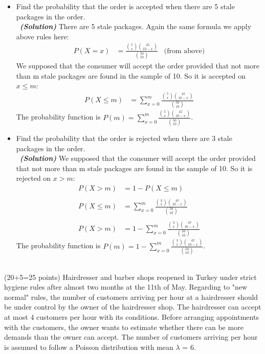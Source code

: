 \documentclass[a4 paper]{article}
\numberwithin{equation}{section}
\newcommand{\problem}[2]{~\\\fbox{\textbf{Problem #1}}\hfill (#2 points)\newline\newline}
\newcommand{\solution}{~\newline\textbf{\textit{(Solution)}} }
\newcommand{\0}{\mathbf{0}}
\begin{document}
\begin{itemize}
	\item Find the probability that the order is accepted when there are 5 stale packages in the order.\\
	\solution
	   There are 5 stale packages. Again the same formula we apply above rules here:
	   \begin{align*}
	       P(X=x) &= \frac{\binom{5}{x}\binom{45}{10-x}}{\binom{50}{10}}  \;\;\; \text{(from above)}
	   \end{align*}
	We supposed that the consumer will accept the order provided that not more than m stale packages are found in the sample of 10. So it is accepted on $x\leq m$:
	\begin{align*}
	    P(X\leq m) &= \sum_{x=0}^{m}\frac{\binom{5}{x}\binom{45}{10-x}}{\binom{50}{10}}
	\end{align*}
	The probability function is $P(m) = \sum_{x=0}^{m}\frac{\binom{5}{x}\binom{45}{10-x}}{\binom{50}{10}}$.
	\newline
	\item Find the probability that the order is rejected when there are 3 stale packages in the order.\\
	\solution
	We supposed that the consumer will accept the order provided that not more than m stale packages are found in the sample of 10. So it is rejected on $x > m$:
	    \begin{align*}
	    P(X>m) &=  1 - P(X \leq m) \\ \\
	    P(X\leq m) &= \sum_{x=0}^{m}\frac{\binom{3}{x}\binom{47}{10-x}}{\binom{50}{10}} \\ \\
	    P(X>m) &= 1 - \sum_{x=0}^{m}\frac{\binom{3}{x}\binom{47}{10-x}}{\binom{50}{10}}
	\end{align*}
	The probability function is $P(m) =  1 - \sum_{x=0}^{m}\frac{\binom{3}{x}\binom{47}{10-x}}{\binom{50}{10}}$.
	\newline
\end{itemize}
\problem{2:}{20+5=25}
Hairdresser and barber shops reopened in Turkey under strict hygiene rules after almost two months at the 11th of May. Regarding to "new normal" rules, the number of customers arriving per hour at a hairdresser should be under control by the owner of the hairdresser shop. The hairdresser can accept at most 4 customers per hour with its conditions.
Before arranging appointments with the customers, the owner wants to estimate whether there can be more demands than the owner can accept. The number of customers arriving per hour is assumed to follow
a Poisson distribution with mean $\lambda$ = 6.
\end{document}
